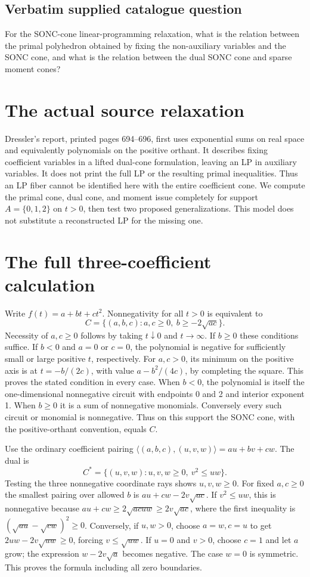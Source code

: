 \documentclass[11pt]{article}
\begin{document}
\subsection{Verbatim supplied catalogue question}
For the SONC-cone linear-programming relaxation, what is the relation between the primal polyhedron obtained by fixing the non-auxiliary variables and the SONC cone, and what is the relation between the dual SONC cone and sparse moment cones?

\section{The actual source relaxation}
Dressler's report, printed pages 694--696, first uses exponential sums
on real space and equivalently polynomials on the positive orthant.
It describes fixing coefficient variables in a lifted dual-cone
formulation, leaving an LP in auxiliary variables. It does not print
the full LP or the resulting primal inequalities. Thus an LP fiber
cannot be identified here with the entire coefficient cone.
We compute the primal cone, dual cone, and moment issue completely
for support $A=\{0,1,2\}$ on $t>0$, then test two proposed generalizations.
This model does not substitute a reconstructed LP for the missing one.

\section{The full three-coefficient calculation}
Write $f(t)=a+bt+ct^2$. Nonnegativity for all $t>0$ is equivalent to
\[
C=\{(a,b,c):a,c\ge0,\ b\ge-2\sqrt{ac}\}.
\]
Necessity of $a,c\ge0$ follows by taking $t\downarrow0$ and
$t\to\infty$. If $b\ge0$ these conditions suffice. If $b<0$ and
$a=0$ or $c=0$, the polynomial is negative for sufficiently small or
large positive $t$, respectively. For $a,c>0$, its minimum on the
positive axis is at $t=-b/(2c)$, with value $a-b^2/(4c)$, by completing
the square. This proves the stated condition in every case.
When $b<0$, the polynomial is itself the one-dimensional nonnegative
circuit with endpoints 0 and 2 and interior exponent 1. When $b\ge0$
it is a sum of nonnegative monomials. Conversely every such circuit
or monomial is nonnegative. Thus on this support the SONC cone, with
the positive-orthant convention, equals $C$.

Use the ordinary coefficient pairing
$\langle(a,b,c),(u,v,w)\rangle=au+bv+cw$.
The dual is
\[
C^*=\{(u,v,w):u,v,w\ge0,\ v^2\le uw\}.
\]
Testing the three nonnegative coordinate rays shows $u,v,w\ge0$.
For fixed $a,c\ge0$ the smallest pairing over allowed $b$ is
$au+cw-2v\sqrt{ac}$. If $v^2\le uw$, this is nonnegative because
$au+cw\ge2\sqrt{acuw}\ge2v\sqrt{ac}$, where the first inequality
is $(\sqrt{au}-\sqrt{cw})^2\ge0$.
Conversely, if $u,w>0$, choose $a=w,c=u$ to get
$2uw-2v\sqrt{uw}\ge0$, forcing $v\le\sqrt{uw}$.
If $u=0$ and $v>0$, choose $c=1$ and let $a$ grow; the expression
$w-2v\sqrt a$ becomes negative. The case $w=0$ is symmetric.
This proves the formula including all zero boundaries.
\end{document}
